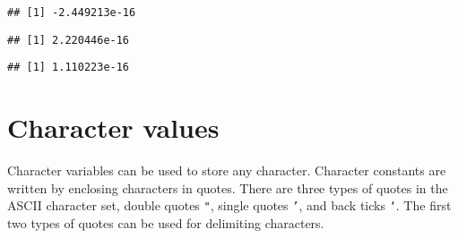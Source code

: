 \documentclass[paper=a4,10pt,div=17,headsepline,BCOR=12mm,twoside,open=right]{scrbook}\usepackage{knitr}
\begin{document}
\begin{knitrout}
\begin{kframe}
\begin{alltt}
\hlstd{(} \hlopt{*} 
\end{alltt}
\begin{verbatim}
## [1] -2.449213e-16
\end{verbatim}
\begin{alltt}
\hlopt{$} 
\end{alltt}
\begin{verbatim}
## [1] 2.220446e-16
\end{verbatim}
\begin{alltt}
\hlopt{$}
\end{alltt}
\begin{verbatim}
## [1] 1.110223e-16
\end{verbatim}
\end{kframe}
\end{knitrout}

\section{Character values}

Character variables can be used to store any character. Character constants are written by enclosing characters in quotes. There are three types of quotes in the ASCII character set, double quotes \texttt{"}, single quotes \texttt{'}, and back ticks \texttt{`}. The first two types of quotes can be used for delimiting characters.
\end{document}
